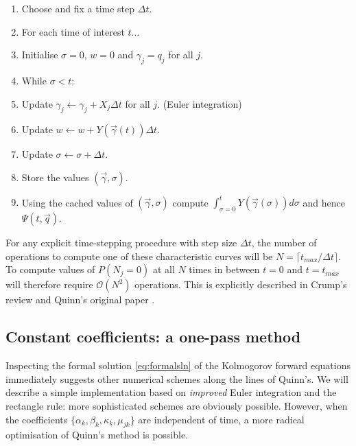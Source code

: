 \documentclass{article}
\begin{document}
\begin{enumerate}
    \item Choose and fix a time step $\Delta t$.
    \item For each time of interest $t$...
    \item Initialise $\sigma = 0$, $w = 0$ and $\gamma_j = q_j$ for all $j$.
    \item While $\sigma < t$:
    \item Update $\gamma_j \leftarrow \gamma_j + X_j \Delta t$ for all $j$.
    (Euler integration)
    \item Update $w \leftarrow w + Y(\vec{\gamma}(t)) \Delta t$.
    \item Update $\sigma \leftarrow \sigma + \Delta t$.
    \item Store the values $(\vec{\gamma}, \sigma)$.
    \item Using the cached values of $(\vec{\gamma}, \sigma)$ compute $\int_{\sigma=0}^t
    Y(\vec{\gamma}(\sigma)) d\sigma$ and hence $\Psi(t, \vec{q})$.
\end{enumerate}


For any explicit time-stepping procedure with step size $\Delta t$, the number
of operations to compute one of these characteristic curves will be $N = \lceil
t_{max} / \Delta t \rceil$. To compute values of $P(N_j = 0)$ at all $N$ times
in between $t=0$ and $t=t_{max}$ will therefore require $\mathcal{O}(N^2)$
operations. This is explicitly described in Crump's review and Quinn's original
paper \cite{crump2005numerical,quinn1989calculating}.

\subsection{Constant coefficients: a one-pass method}
\label{sec:flying}

Inspecting the formal solution \eqref{eq:formalsln} of the Kolmogorov forward
equations immediately
suggests other numerical schemes along the lines of Quinn's. We will describe a simple
implementation based on \emph{improved} Euler integration and the rectangle rule: more
sophisticated schemes are obviously possible.
However, when the coefficients $\{\alpha_k, \beta_k, \kappa_k, \mu_{jk}\}$ are
independent of time, a more radical optimisation of Quinn's method is possible.
\end{document}
